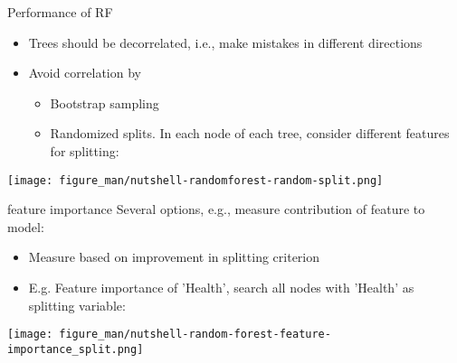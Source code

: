 \documentclass[11pt,compress,t,notes=noshow, xcolor=table]{beamer}
\begin{document}
\begin{vbframe}{Performance of RF}
\begin{itemize} 
\item \small Trees should be decorrelated, i.e., make mistakes in different directions
\item \small Avoid correlation by
    \begin{itemize}
        \item \small Bootstrap sampling 
        \item \small Randomized splits. In each node of each tree, consider different features for splitting:
    \end{itemize}
\end{itemize}

\vspace{0.5cm}
\begin{center}
  \texttt{[image: figure\_man/nutshell-randomforest-random-split.png]}
\end{center}




\end{vbframe}


\begin{vbframe}{feature importance}
Several options, e.g., measure contribution of feature to model:
    \begin{itemize}
        \item \small Measure based on improvement in splitting criterion
        \item \small E.g. Feature importance of 'Health', search all nodes with 'Health' as splitting variable:
    \end{itemize}


\texttt{[image: figure\_man/nutshell-random-forest-feature-importance\_split.png]}
\end{vbframe}
\end{document}
